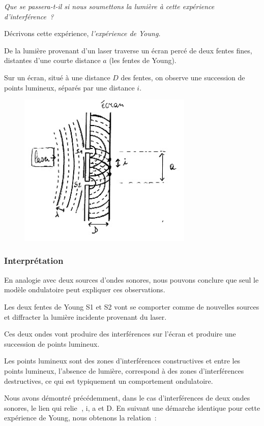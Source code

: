 \emph{Que se passera-t-il si nous soumettons la lumière à cette expérience
d'interférence~? }

Décrivons cette expérience, \emph{l'expérience de Young.}

De la lumière provenant d'un laser traverse un écran percé de deux
fentes fines, distantes d'une courte distance $a$ (les fentes de Young).

Sur un écran, situé à une distance $D$ des fentes, on observe une
succession de points lumineux, séparés par une distance $i$.

\begin{figure}
\centering
\includegraphics[width=8.299cm,height=7.35cm]{Pictures/10000001000001410000011C9E9E805F9A9605B7.png}
\caption{}
\end{figure}

\subsubsection{Interprétation }

En analogie avec deux sources d'ondes sonores, nous pouvons conclure que
seul le modèle ondulatoire peut expliquer ces observations.

Les deux fentes de Young S1 et S2 vont se comporter comme de nouvelles
sources et diffracter la lumière incidente provenant du laser.

Ces deux ondes vont produire des interférences sur l'écran et produire
une succession de points lumineux.

Les points lumineux sont des zones d'interférences constructives et
entre les points lumineux, l'absence de lumière, correspond à des zones
d'interférences destructives, ce qui est typiquement un comportement
ondulatoire.

Nous avons démontré précédemment, dans le cas d'interférences de deux
ondes sonores, le lien qui relie , i, a et D. En suivant une démarche
identique pour cette expérience de Young, nous obtenons la relation~:

